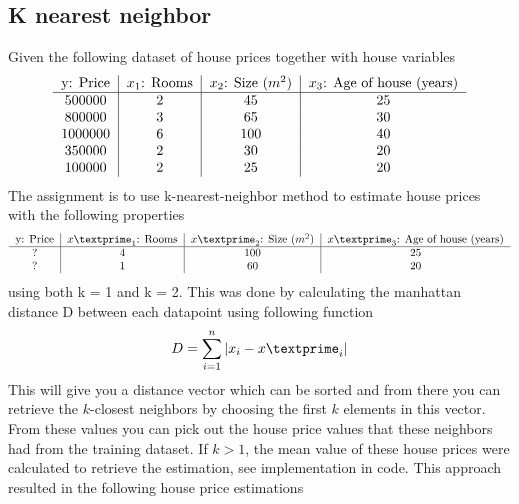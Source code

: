 \documentclass{article}
\begin{document}
    \subsection{K nearest neighbor}
    Given the following dataset of house prices together with house variables 
    \begin{equation}
        \begin{tabular}{ c | c | c | c }
            y: Price & $x_1$: Rooms & $x_2$: Size ($m^2$) & $x_3$: Age of house (years)\\ \hline
            500000 & 2 & 45 & 25\\
            800000 & 3 & 65 & 30\\ 
            1000000 & 6 & 100 & 40\\
            350000 &2 & 30 & 20 \\
            100000 & 2 & 25 & 20 
        \end{tabular}
    \end{equation}
    The assignment is to use k-nearest-neighbor method to estimate house prices with the following properties
    \begin{equation}
        \begin{tabular}{ c | c | c | c }
            y: Price & $x\textprime_1$: Rooms & $x\textprime_2$: Size ($m^2$) & $x\textprime_3$: Age of house (years)\\ \hline
            ? & 4 & 100 & 25\\
            ? & 1 & 60 & 20\\ 
        \end{tabular}
    \end{equation}
    using both k = 1 and k = 2. This was done by calculating the manhattan distance D between each datapoint using following function
    \begin{equation}
        D = \sum_{i=1}^n |x_i - x\textprime_i|
    \end{equation}
    This will give you a distance vector which can be sorted and from there you can retrieve the $k$-closest neighbors by choosing the first $k$ elements in this vector. From these values you can pick out the house price values that these neighbors had from the training dataset. If $k > 1$, the mean value of these house prices were calculated to retrieve the estimation, see implementation in code. This approach resulted in the following house price estimations
    
\end{document}
